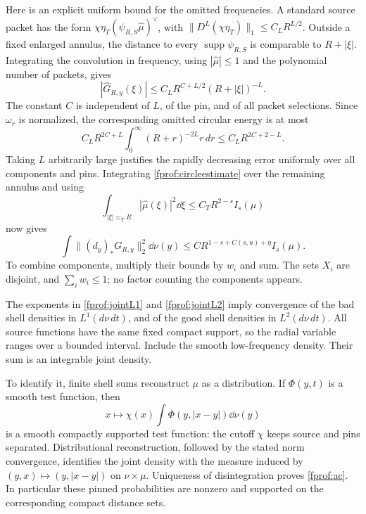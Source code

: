 Here is an explicit uniform bound for the omitted frequencies. A standard
source packet has the form
\(\chi\eta_T(\psi_{R,S}\widehat\mu)^\vee\), with
\(\|D^L(\chi\eta_T)\|_1\le C_LR^{L/2}\). Outside a fixed enlarged
annulus, the distance to every \(\operatorname{supp}\psi_{R,S}\) is
comparable to \(R+|\xi|\). Integrating the convolution in frequency,
using \(|\widehat\mu|\le1\) and the polynomial number of packets, gives
\[
 |\widehat G_{R,y}(\xi)|
 \le C_LR^{C+L/2}(R+|\xi|)^{-L}.
\]
The constant \(C\) is independent of \(L\), of the pin, and of all
packet selections. Since \(\omega_r\) is normalized, the corresponding
omitted circular energy is at most
\[
 C_LR^{2C+L}\int_0^\infty(R+r)^{-2L}r\,dr
 \le C_LR^{2C+2-L}.
\]
Taking \(L\) arbitrarily large justifies the rapidly decreasing error
uniformly over all components and pins. Integrating
\eqref{fprof:circleestimate} over the remaining annulus and using
$$
 \int_{|\xi|\asymp_T R}|\widehat\mu(\xi)|^2\dd\xi
 \leq C_T R^{2-s}I_s(\mu)
$$
now gives
\begin{equation}\label{fprof:jointL2}
 \int\|(d_y)_*G_{R,y}\|_2^2\dd\nu(y)
 \leq C R^{1-s+C(s,u)+\eta}I_s(\mu).
\end{equation}
To combine components, multiply their bounds by \(w_i\) and sum. The sets \(X_i\) are disjoint, and \(\sum_iw_i\leq1\); no factor counting the components appears.

The exponents in \eqref{fprof:jointL1} and \eqref{fprof:jointL2} imply convergence of the bad shell densities in \(L^1(d\nu\,dt)\), and of the good shell densities in \(L^2(d\nu\,dt)\). All source functions have the same fixed compact support, so the radial variable ranges over a bounded interval. Include the smooth low-frequency density. Their sum is an integrable joint density.

To identify it, finite shell sums reconstruct \(\mu\) as a distribution. If \(\Phi(y,t)\) is a smooth test function, then
$$
 x\longmapsto\chi(x)\int\Phi(y,|x-y|)\dd\nu(y)
$$
is a smooth compactly supported test function: the cutoff \(\chi\) keeps source and pins separated. Distributional reconstruction, followed by the stated norm convergence, identifies the joint density with the measure induced by \((y,x)\mapsto(y,|x-y|)\) on \(\nu\times\mu\). Uniqueness of disintegration proves \eqref{fprof:ac}. In particular these pinned probabilities are nonzero and supported on the corresponding compact distance sets.

